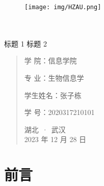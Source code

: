 \documentclass[UTF8]{ctexart}
\date{}
\begin{document}
	\begin{figure}[t]
		\centering
        \texttt{[image: img/HZAU.png]}
	\end{figure}

	\begin{center}
		\quad \\
		\quad \\
		\heiti \fontsize{45}{17} 标题 1
		\vskip 3.5cm
		\heiti {} 标题 2
	\end{center}

	\vskip 3.5cm

	\begin{quotation}
		\heiti \fontsize{15}{15}
		\doublespacing
		\par\setlength\parindent{12em}
		\quad

		学\hspace{0.61cm} 院：信息学院

		专\hspace{0.61cm} 业：生物信息学

		学生姓名：张子栋

		学\hspace{0.61cm} 号：2020317210101


		\vskip 1.5cm
		\centering
        湖北~·~武汉\\
		2023 年 12 月 28 日
	\end{quotation}

	\newpage

    \tableofcontents
    
    \setcounter{page}{0}

    \thispagestyle{empty}

    \newpage

	\section{前言}
	
	\begin{thebibliography}{99}
		
	\end{thebibliography}
\end{document}
